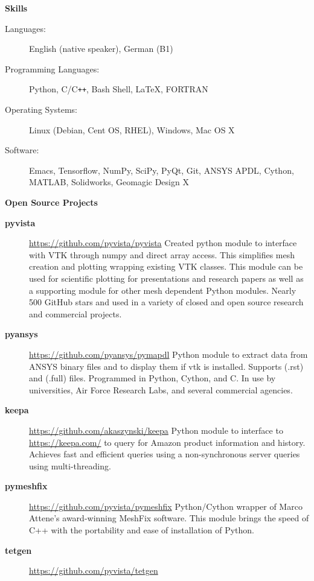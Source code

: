 \documentclass[letterpaper,11pt]{article}
\newcommand{\resheading}[1]{{\large \colorbox{mygrey}{\begin{minipage}{\textwidth}{\textbf{#1 \vphantom{p\^{E}}}}\end{minipage}}}}
\begin{document}
\resheading{Skills}

\begin{description}
\item [Languages:] English (native speaker), German (B1)
\item[Programming Languages:] Python, C/C{}\verb!++!, Bash Shell, \LaTeX, FORTRAN
\item[Operating Systems:] Linux (Debian, Cent OS, RHEL), Windows, Mac OS X
\item[Software:] Emacs, Tensorflow, NumPy, SciPy, PyQt, Git, ANSYS APDL, Cython, MATLAB, Solidworks, Geomagic Design X
\end{description}

\resheading{Open Source Projects}

\begin{description}
\item[\textbf{pyvista}] \url{https://github.com/pyvista/pyvista} \newline
  Created python module to interface with VTK through numpy and direct array access. This simplifies mesh creation and plotting wrapping existing VTK classes.  This module can be used for scientific plotting for presentations and research papers as well as a supporting module for other mesh dependent Python modules.  Nearly 500 GitHub stars and used in a variety of closed and open source research and commercial projects.
\item[\textbf{pyansys}] \url{https://github.com/pyansys/pymapdl} \newline
  Python module to extract data from ANSYS binary files and to display them if vtk is installed.  Supports (.rst) and (.full) files.  Programmed in Python, Cython, and C.  In use by universities, Air Force Research Labs, and several commercial agencies.
\item[\textbf{keepa}] \url{https://github.com/akaszynski/keepa} \newline
Python module to interface to \url{https://keepa.com/} to query for Amazon product information and history.  Achieves fast and efficient queries using a non-synchronous server queries using multi-threading.
\item[\textbf{pymeshfix}] \url{https://github.com/pyvista/pymeshfix} \newline
Python/Cython wrapper of Marco Attene's award-winning MeshFix software. This module brings the speed of C++ with the portability and ease of installation of Python.
\item[\textbf{tetgen}] \url{https://github.com/pyvista/tetgen} \newline

\end{description}
\end{document}
